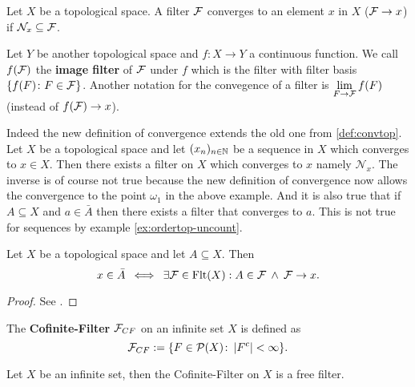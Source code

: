 \begin{defin}
  Let $X$ be a topological space. A filter $\mathcal{F}$ converges to an element $x$ in $X$ ($\mathcal{F} \to x$) if $\mathcal{N}_x \subseteq \mathcal{F}$. 
  
  Let $Y$ be another topological space and $f: X \to Y$ a continuous function. 
  We call $f(\mathcal{F})$ the \textbf{image filter} of $\mathcal{F}$ under $f$ which is the filter with filter basis $\{f(F)\colon F \in \mathcal{F}\}$. Another notation for the convegence of a filter is $\lim\limits_{F\to\mathcal{F}}f(F)$ (instead of $f(\mathcal{F}) \to x$).
\end{defin}

Indeed the new definition of convergence extends the old one from \ref{def:convtop}. Let $X$ be a topological space and let $(x_n)_{n\in\mathbb{N}}$ be a sequence in $X$ which converges to $x \in X$. Then there exists a filter on $X$ which converges to $x$ namely $\mathcal{N}_x$. The inverse is of course not true because the new definition of convergence now allows the convergence to the point $\omega_1$ in the above example. And it is also true that if $A \subseteq X$ and $a \in \bar{A}$ then there exists a filter that converges to $a$. This is not true for sequences by example \ref{ex:ordertop-uncount}.

\begin{thm}\label{thm:fcl}
  Let $X$ be a topological space and let $A \subseteq X$. Then
  \begin{equation*}
    x \in \bar{A} \: \iff \: \exists \mathcal{F} \in {\rm Flt}(X): A \in \mathcal{F} \: \land \: \mathcal{F} \to x.
  \end{equation*}
\end{thm}

\begin{proof}
  See \cite[5.17 Satz]{BvQMT}.
\end{proof}

\begin{defin}
  The \textbf{Cofinite-Filter} $\mathcal{F}_{CF}$ on an infinite set $X$ is defined as 
  \begin{equation*}
    \mathcal{F}_{CF} := \{ F \in \mathcal{P}(X)\colon \left| F^c \right| < \infty\}.
  \end{equation*}
\end{defin}

\begin{lemma}\label{lem:coffil}
  Let $X$ be an infinite set, then the Cofinite-Filter on $X$ is a free filter.
\end{lemma}

